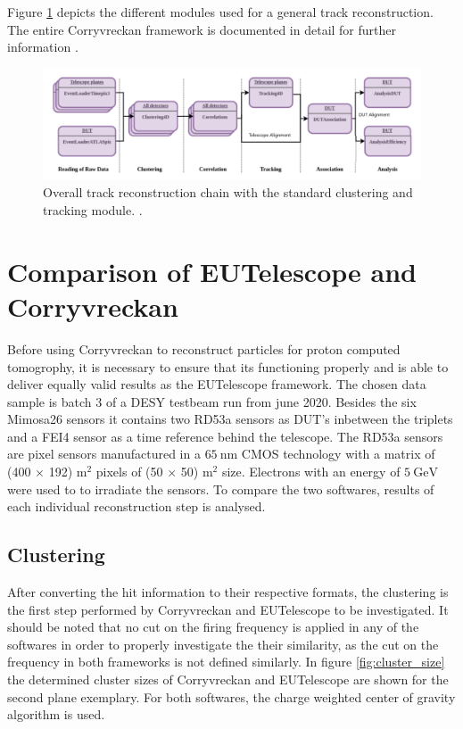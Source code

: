 Figure \ref{fig:corry_track_reco} depicts
the different modules used for a general track reconstruction. The entire Corryvreckan framework is documented in detail for further information \cite{corry_manual}.

\begin{figure}
  \centering
  \includegraphics[height=0.3\textwidth]{images/corry.png}
  \caption{Overall track reconstruction chain with the standard clustering and tracking module. \cite{corry_track_reco}.}
  \label{fig:corry_track_reco}
\end{figure}

\chapter{Comparison of EUTelescope and Corryvreckan}\label{make}
Before using Corryvreckan to reconstruct particles for proton computed tomogrophy, it is necessary to ensure that its functioning properly
and is able to deliver equally valid results as the EUTelescope framework.
The chosen data sample is batch 3 of a DESY testbeam run from june 2020. Besides the six Mimosa26 sensors it contains two RD53a sensors
as DUT's inbetween the triplets and a FEI4 sensor as a time reference behind the telescope. The RD53a sensors are pixel sensors
manufactured in a $\SI{65}{\nano\meter}$ CMOS technology with a matrix of (400 $\times$ 192) \textmu m$^2$ pixels of
(50 $\times$ 50) \textmu m$^2$ size. Electrons with an energy of $\SI{5}{\GeV}$ were used to to irradiate the sensors.
To compare the two softwares, results of each individual
reconstruction step is analysed. \\

\section{Clustering}
After converting the hit information to their respective formats, the clustering is the first step performed by Corryvreckan and EUTelescope
to be investigated.
It should be noted that no cut on the firing frequency is applied in any of the softwares in order to properly investigate
the their similarity, as the cut on the frequency in both frameworks is not defined similarly.
In figure \ref{fig:cluster_size} the determined cluster sizes of Corryvreckan and EUTelescope are shown for the second plane exemplary.
For both softwares, the charge weighted center of gravity algorithm is used.

